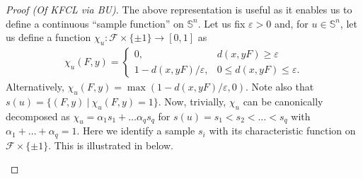 \documentclass{article} %
\newcommand{\F}{\mathcal{F}}
\renewcommand{\SS}{\mathbb{S}}
\begin{document}
\begin{proof}[Proof (Of KFCL via BU)]
	
	The above representation is useful as it enables us to define a continuous ``sample function'' on $\SS^n$. Let us fix $\varepsilon > 0$ and, for $u\in \SS^n$, let us define a function $\chi_u\colon \F\times \{\pm 1\} \rightarrow [0, 1]$ as 
	\begin{align*}
		\chi_u(F, y) = \begin{cases}
				0, & d(x, yF) \geq \varepsilon \\
				1 - d(x, yF)/\varepsilon, & 0\leq d(x, yF)\leq \varepsilon.
			\end{cases}
	\end{align*}
	Alternatively, $\chi_u(F, y) = \max(1 - d(x, yF)/\varepsilon, 0)$. Note also that $s(u) = \{(F, y)~|~\allowbreak\chi_u(F, y) = 1\}$. Now, trivially, $\chi_u$ can be canonically decomposed as $\chi_u = \alpha_1 s_1 + \dots \alpha_q s_q$ for $s(u) = s_1 < s_2 < \dots < s_q$ with $\alpha_1 + \dots + \alpha_q = 1$. Here we identify a sample $s_i$ with its characteristic function on $\F\times \{\pm1\}$. This is illustrated in  below.	 
	
	
	
	\begin{figure}[hbt]
	    \centering
{}
\end{figure}
\end{proof}
\end{document}

